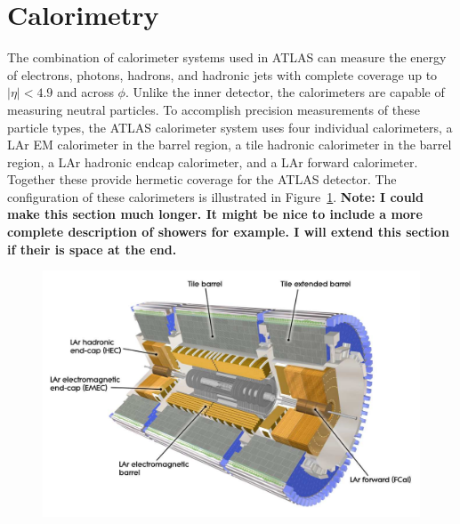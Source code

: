 
\section{Calorimetry}

The combination of calorimeter systems used in \ac{ATLAS} can measure the energy of electrons, photons, hadrons, and hadronic jets with complete coverage up to $|\eta| < 4.9$ and across $\phi$.
Unlike the inner detector, the calorimeters are capable of measuring neutral particles.
To accomplish precision measurements of these particle types, the \ac{ATLAS} calorimeter system uses four individual calorimeters, a \ac{LAr} \acl{EM} calorimeter in the barrel region, a tile hadronic calorimeter in the barrel region, a \ac{LAr} hadronic endcap calorimeter, and a \ac{LAr} forward calorimeter.
Together these provide hermetic coverage for the \ac{ATLAS} detector.
The configuration of these calorimeters is illustrated in Figure~\ref{fig:calo_overview}. 
\textbf{Note: I could make this section much longer. It might be nice to include a more complete description of showers for example. I will extend this section if their is space at the end.}

\begin{figure}[hbtp]
\includegraphics[width=\fullfig]{figures/calo_overview.pdf}
\caption{}
\label{fig:calo_overview}
\end{figure}

